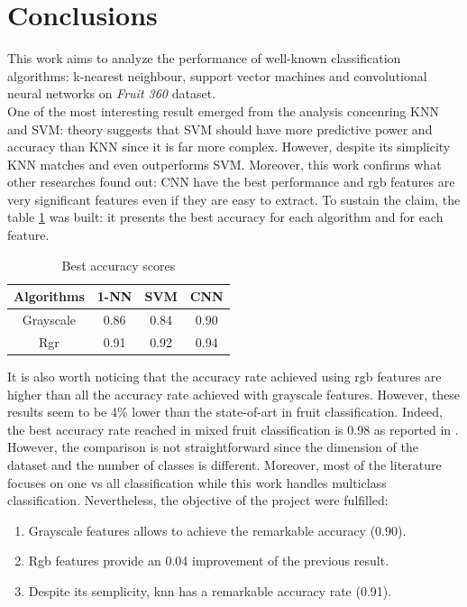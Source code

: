\documentclass{article}
\begin{document}
\newpage
\section{Conclusions}
This work aims to analyze the performance of well-known classification algorithms: k-nearest neighbour, support vector machines and convolutional neural networks on \textit{Fruit 360} dataset.\\
One of the most interesting result emerged from the analysis concenring KNN and SVM: theory suggests that SVM should have more predictive power and accuracy than KNN since it is far more complex. However, despite its simplicity KNN matches and even outperforms SVM. Moreover, this work confirms what other researches found out: CNN have the best performance and rgb features are very significant features even if they are easy to extract. To sustain the claim, the table \ref{results} was built: it presents the best accuracy for each algorithm and for each feature.
\begin{table}[H]
\centering
 \begin{tabular}{|c|c|c|c|} 
 \hline
  Algorithms & 1-NN & SVM & CNN\\
 \hline
 Grayscale&0.86&0.84&0.90 \\
 \hline
 Rgr&0.91& 0.92 & 0.94  \\
 \hline
\end{tabular}
\caption{Best accuracy scores} \label{results}
\end{table}
\noindent It is also worth noticing that the accuracy rate achieved using rgb features are higher than all the accuracy rate achieved with grayscale features. However, these results seem to be 4\% lower than the state-of-art in fruit classification. Indeed, the best accuracy rate reached in mixed fruit classification is 0.98 as reported in \cite{review}. However, the comparison is not straightforward since the dimension of the dataset and the number of classes is different. Moreover, most of the literature focuses on one vs all classification while this work handles multiclass classification. Nevertheless, the objective of the project were fulfilled:
\begin{enumerate}
\item Grayscale features allows to achieve the remarkable accuracy (0.90).
\item Rgb features provide an 0.04 improvement of the previous result.
\item Despite its semplicity, knn has a remarkable accuracy rate (0.91).
\end{enumerate}
\end{document}

